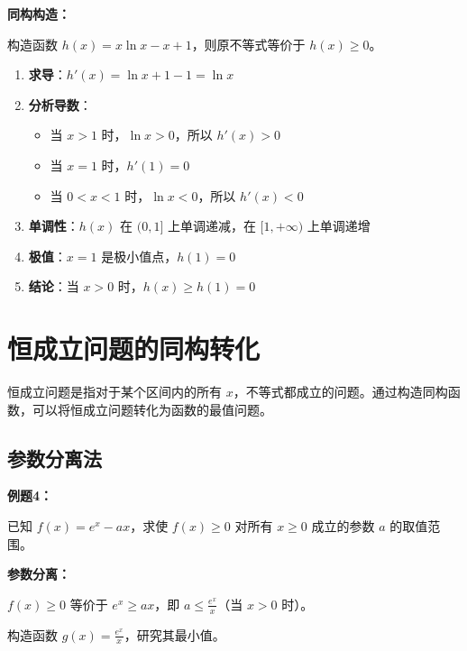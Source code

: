 \documentclass[a4paper,11pt]{ctexrep}
\newcommand{\exampleicon}{\ModeBadge[highlight]{例题}}
\newcommand{\analysisicon}{\ModeBadge[secondary]{分析}}
\theoremstyle{definition}
\begin{document}
\analysisicon \textbf{同构构造：}

构造函数 $h(x) = x\ln x - x + 1$，则原不等式等价于 $h(x) \geq 0$。

\begin{enumerate}
    \item \textbf{求导}：$h'(x) = \ln x + 1 - 1 = \ln x$
    \item \textbf{分析导数}：
    \begin{itemize}
        \item 当 $x > 1$ 时，$\ln x > 0$，所以 $h'(x) > 0$
        \item 当 $x = 1$ 时，$h'(1) = 0$
        \item 当 $0 < x < 1$ 时，$\ln x < 0$，所以 $h'(x) < 0$
    \end{itemize}
    \item \textbf{单调性}：$h(x)$ 在 $(0, 1]$ 上单调递减，在 $[1, +\infty)$ 上单调递增
    \item \textbf{极值}：$x = 1$ 是极小值点，$h(1) = 0$
    \item \textbf{结论}：当 $x > 0$ 时，$h(x) \geq h(1) = 0$
\end{enumerate}

\section{恒成立问题的同构转化}

恒成立问题是指对于某个区间内的所有 $x$，不等式都成立的问题。通过构造同构函数，可以将恒成立问题转化为函数的最值问题。

\subsection{参数分离法}

\exampleicon \textbf{例题4：}

已知 $f(x) = e^x - ax$，求使 $f(x) \geq 0$ 对所有 $x \geq 0$ 成立的参数 $a$ 的取值范围。

\analysisicon \textbf{参数分离：}

$f(x) \geq 0$ 等价于 $e^x \geq ax$，即 $a \leq \frac{e^x}{x}$（当 $x > 0$ 时）。

构造函数 $g(x) = \frac{e^x}{x}$，研究其最小值。
\end{document}
